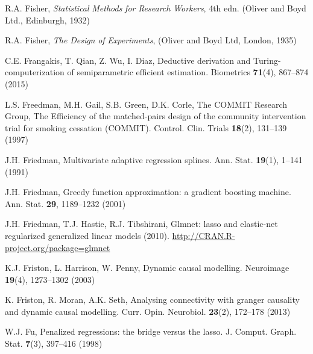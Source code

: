 \begin{list}{}{\setlength{\leftmargin}{2.1em}\setlength{\labelwidth}{0pt}
  \setlength{\labelsep}{0pt}\setlength{\itemindent}{-2.1em}
  \setlength{\parsep}{0pt}\setlength{\itemsep}{2pt}\setlength{\topsep}{0pt}}
\item\label{refentry:REF106}R.A. Fisher, \textit{Statistical} \textit{Methods} \textit{for} \textit{Research} \textit{Workers}, 4th edn. (Oliver and Boyd Ltd., Edinburgh, 1932)\label{refend:REF106}
\item\label{refentry:REF107}R.A. Fisher, \textit{The} \textit{Design} \textit{of} \textit{Experiments}, (Oliver and Boyd Ltd, London, 1935)\label{refend:REF107}
\item\label{refentry:REF108}C.E. Frangakis, T. Qian, Z. Wu, I. Diaz, Deductive derivation and Turing-computerization of semiparametric efficient estimation. Biometrics \textbf{71}(4), 867--874 (2015)\label{refend:REF108}
\item\label{refentry:REF109}L.S. Freedman, M.H. Gail, S.B. Green, D.K. Corle, The COMMIT Research Group, The Efficiency of the matched-pairs design of the community intervention trial for smoking cessation (COMMIT). Control. Clin. Trials \textbf{18}(2), 131--139 (1997)\label{refend:REF109}
\item\label{refentry:REF110}J.H. Friedman, Multivariate adaptive regression splines. Ann. Stat. \textbf{19}(1), 1--141 (1991)\label{refend:REF110}
\item\label{refentry:REF111}J.H. Friedman, Greedy function approximation: a gradient boosting machine. Ann. Stat. \textbf{29}, 1189--1232 (2001)\label{refend:REF111}
\item\label{refentry:REF112}J.H. Friedman, T.J. Hastie, R.J. Tibshirani, Glmnet: lasso and elastic-net regularized generalized linear models (2010). \url{http://CRAN.R-project.org/package=glmnet}\label{refend:REF112}
\item\label{refentry:REF113}K.J. Friston, L. Harrison, W. Penny, Dynamic causal modelling. Neuroimage \textbf{19}(4), 1273--1302 (2003)\label{refend:REF113}
\item\label{refentry:REF114}K. Friston, R. Moran, A.K. Seth, Analysing connectivity with granger causality and dynamic causal modelling. Curr. Opin. Neurobiol. \textbf{23}(2), 172--178 (2013)\label{refend:REF114}
\item\label{refentry:REF115}W.J. Fu, Penalized regressions: the bridge versus the lasso. J. Comput. Graph. Stat. \textbf{7}(3), 397--416 (1998)\label{refend:REF115}

\end{list}
